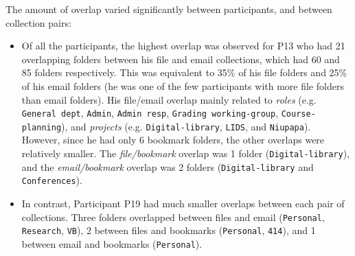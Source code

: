 The amount of overlap varied significantly between participants, and between collection pairs:
\begin{itemize}
\item Of all the participants, the highest overlap was observed for P13 who had 21 overlapping folders between his file and email collections, which had 60 and 85 folders respectively.  This was equivalent to 35\% of his file folders and 25\% of his email folders (he was one of the few participants with more file folders than email folders).  His file/email overlap mainly related to \textit{roles} (e.g. \texttt{General dept}, \texttt{Admin}, \texttt{Admin resp}, \texttt{Grading working-group}, \texttt{Course-planning}), and \textit{projects} (e.g. \texttt{Digital-library}, \texttt{LIDS}, and  \texttt{Niupapa}). However, since he had only 6 bookmark folders, the other overlaps were relatively smaller.  The \textit{file/bookmark} overlap was 1 folder (\texttt{Digital-library}), and the \textit{email/bookmark} overlap was 2 folders (\texttt{Digital-library} and \texttt{Conferences}).

\item In contrast, Participant P19 had much smaller overlaps between each pair of collections. Three folders overlapped between files and email (\texttt{Personal}, \texttt{Research}, \texttt{VB}), 2 between files and bookmarks (\texttt{Personal}, \texttt{414}), and 1 between email and bookmarks (\texttt{Personal}).
\end{itemize}

